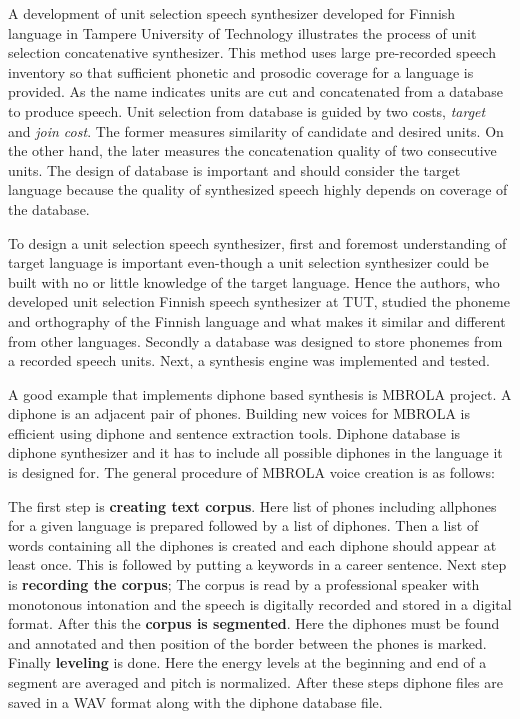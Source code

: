 \documentclass[11pt,a4paper,oneside,article]{memoir}
\begin{document}
A development of unit selection speech synthesizer developed for Finnish language in Tampere University of Technology illustrates the process of unit selection concatenative synthesizer. This method uses large pre-recorded speech inventory so that sufficient phonetic and prosodic coverage for a language is provided. As the name indicates units are cut and concatenated from a database to produce speech. Unit selection from database is guided by two costs, \emph{target} and \emph{join cost}.  The former measures similarity of candidate and desired units. On the other hand, the later measures the concatenation quality of two consecutive units. The design of database is important and should consider the target language because the quality of synthesized speech highly depends on coverage of the database.

To design a unit selection speech synthesizer, first and foremost understanding of target language is important even-though a unit selection synthesizer could be built with no or little knowledge of the target language\cite{silen}. Hence the authors, who developed unit selection Finnish speech synthesizer at TUT, studied the phoneme and orthography of the Finnish language and what makes it similar and different from other languages. Secondly a database was designed to store phonemes from a recorded speech units. Next, a synthesis engine was implemented and tested. 

A good example that implements diphone based synthesis is MBROLA project. A diphone is an adjacent pair of phones. Building new voices for MBROLA is efficient using diphone and sentence extraction tools. Diphone database is diphone synthesizer and it has to include all possible diphones in the language it is designed for. The general procedure of MBROLA voice creation is as follows:

The first step is \textbf{creating text corpus}. Here list of phones including allphones for a given language is prepared followed by a list of diphones. Then
a list of words containing all the diphones is created and each diphone should appear at least once. This is followed by putting a keywords in a career sentence. Next step is \textbf{recording the corpus}; The corpus is read by a professional speaker with monotonous intonation and  the speech is digitally recorded and stored in a digital format. After this the \textbf{corpus is segmented}. Here the diphones must be found and annotated and then position of the border between the phones is marked. Finally \textbf{leveling} is done. Here the energy levels at the beginning and end of a segment are averaged and pitch is normalized. After these steps diphone files are saved in a WAV format along with the diphone database file. \cite{jolanta}
\end{document}
